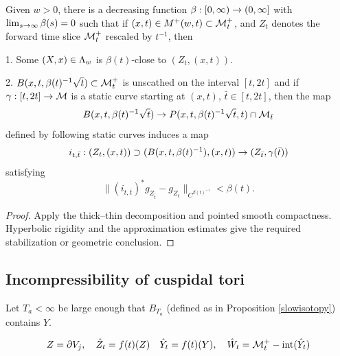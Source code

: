 \begin{lemma}
  \label{lem:kl-hyperbolic-rigidity-stabilization-thick-part-existence-cap-geometry}

\label{II.7.2again}
Given $w>0$, there is a decreasing function
$\beta:[0,\infty)\rightarrow (0,\infty]$
with $\lim_{s\rightarrow\infty}\beta(s)=0$ such that
if
$(x,t)\in M^+(w,t)\subset{\mathcal M}_t^+$,
and  $Z_t$ denotes
the forward time slice
${\mathcal M}_t^+$ rescaled by $t^{-1}$, then

1.  Some $(X,x)\in \Lambda_w$
is $\beta(t)$-close to $(Z_t,(x,t))$.

2.
$B(x,t,\beta(t)^{-1}\sqrt{t})\subset {\mathcal M}_t^+$
is unscathed
on the interval $[t,2t]$ and if $\gamma:[t,2t]\rightarrow {\mathcal M}$ is a static
curve starting at $(x,t)$, $\bar t\in [t,2t]$, then the map
\begin{equation}
B(x,t,\beta(t)^{-1}\sqrt{t})\rightarrow
P(x,t,\beta(t)^{-1}\sqrt{t},t)\cap{\mathcal M}_{\bar t}
\end{equation}
defined by following static curves induces a map
\begin{equation}
i_{t,\bar t}:(Z_t,(x,t))\supset (B(x,t,\beta(t)^{-1}),(x,t))
\rightarrow (Z_{\bar t},\gamma(\bar t))
\end{equation}
satisfying
\begin{equation}
\|\left(i_{t,\bar t}\right)^*g_{Z_{\bar
t}}-g_{Z_t}\|_{C^{\beta(t)^{-1}}}
<\beta(t).
\end{equation}
\end{lemma}

\begin{proof}
\sketch Apply the thick--thin decomposition and pointed smooth compactness. Hyperbolic rigidity and the approximation estimates give the required stabilization or geometric conclusion.
\end{proof}

\subsection{Incompressibility of cuspidal tori} \label{inctori}

Let $T_a<\infty$ be large enough  that  $B_{T_a}$  (defined as in Proposition \ref{slowisotopy})
contains $Y$.

\begin{equation}
Z =  \partial V_{j},\quad\hat Z_t =  f(t)(Z)\\
\quad \hat Y_t =  f(t)(Y),\quad
\hat W_t =  {\mathcal M}_t^+ -  \operatorname{int}(\hat Y_t)
\end{equation}


